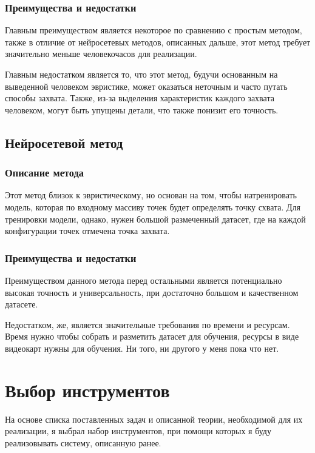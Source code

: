 \documentclass[12pt, a4paper]{article}
\begin{document}
\subsubsection{Преимущества и недостатки}
Главным преимуществом является некоторое по сравнению с простым методом, также в
отличие от нейросетевых методов, описанных дальше, этот метод требует
значительно меньше человекочасов для реализации.
\par
Главным недостатком является то, что этот метод, будучи основанным на выведенной
человеком эвристике, может оказаться неточным и часто путать способы захвата.
Также, из-за выделения характеристик каждого захвата человеком, могут быть упущены детали, что также понизит его точность.

\subsection{Нейросетевой метод}
\subsubsection{Описание метода}
Этот метод близок к эвристическому, но основан на том, чтобы натренировать
модель, которая по входному массиву точек будет определять точку схвата. Для
тренировки модели, однако, нужен большой размеченный датасет, где на каждой
конфигурации точек отмечена точка захвата.

\subsubsection{Преимущества и недостатки}
Преимуществом данного метода перед остальными является потенциально высокая точность и универсальность, при достаточно большом и качественном датасете.
\par
Недостатком, же, является значительные требования по времени и ресурсам. Время
нужно чтобы собрать и разметить датасет для обучения, ресурсы в виде видеокарт
нужны для обучения. Ни того, ни другого у меня пока что нет.
 
\section{Выбор инструментов}
На основе списка поставленных задач и описанной теории, необходимой для их реализации, я выбрал набор инструментов, при помощи которых я буду реализовывать систему, описанную ранее.
\end{document}
